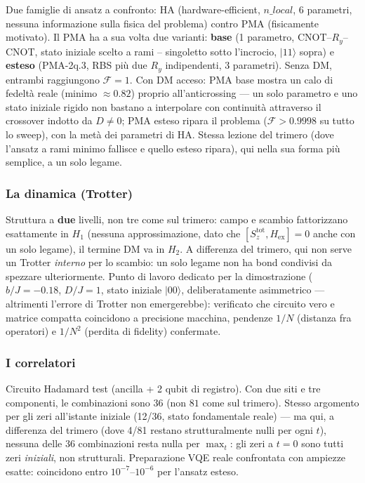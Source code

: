 \documentclass[11pt,a4paper]{article}
\newcommand{\ket}[1]{\lvert #1 \rangle}
\begin{document}
Due famiglie di ansatz a confronto: HA (hardware-efficient, $n\_local$,
6 parametri, nessuna informazione sulla fisica del problema) contro PMA
(fisicamente motivato). Il PMA ha a sua volta due varianti: \textbf{base}
(1 parametro, CNOT--$R_y$--CNOT, stato iniziale scelto a rami --
singoletto sotto l'incrocio, $\ket{11}$ sopra) e \textbf{esteso}
(PMA-2q.3, RBS più due $R_y$ indipendenti, 3 parametri). Senza DM,
entrambi raggiungono $\mathcal F=1$. Con DM acceso: PMA base mostra un
calo di fedeltà reale (minimo $\approx0.82$) proprio all'anticrossing
--- un solo parametro e uno stato iniziale rigido non bastano a
interpolare con continuità attraverso il crossover indotto da
$D\neq0$; PMA esteso ripara il problema ($\mathcal F>0.9998$ su tutto lo
sweep), con la metà dei parametri di HA. Stessa lezione del trimero
(dove l'ansatz a rami minimo fallisce e quello esteso ripara), qui nella
sua forma più semplice, a un solo legame.

\subsubsection{La dinamica (Trotter)}

Struttura a \textbf{due} livelli, non tre come sul trimero: campo e
scambio fattorizzano esattamente in $H_1$ (nessuna approssimazione, dato
che $[S_z^\text{tot},H_\text{ex}]=0$ anche con un solo legame), il
termine DM va in $H_2$. A differenza del trimero, qui non serve un
Trotter \emph{interno} per lo scambio: un solo legame non ha bond
condivisi da spezzare ulteriormente. Punto di lavoro dedicato per la
dimostrazione ($b/J=-0.18$, $D/J=1$, stato iniziale $\ket{00}$,
deliberatamente asimmetrico --- altrimenti l'errore di Trotter non
emergerebbe): verificato che circuito vero e matrice compatta
coincidono a precisione macchina, pendenze $1/N$ (distanza fra
operatori) e $1/N^2$ (perdita di fidelity) confermate.

\subsubsection{I correlatori}

Circuito Hadamard test (ancilla + 2 qubit di registro). Con due siti e
tre componenti, le combinazioni sono $36$ (non $81$ come sul trimero).
Stesso argomento per gli zeri all'istante iniziale (12/36, stato
fondamentale reale) --- ma qui, a differenza del trimero (dove 4/81
restano strutturalmente nulli per ogni $t$), nessuna delle 36
combinazioni resta nulla per $\max_t$: gli zeri a $t=0$ sono tutti zeri
\emph{iniziali}, non strutturali. Preparazione VQE reale confrontata
con ampiezze esatte: coincidono entro $10^{-7}$--$10^{-6}$ per l'ansatz
esteso.
\end{document}
